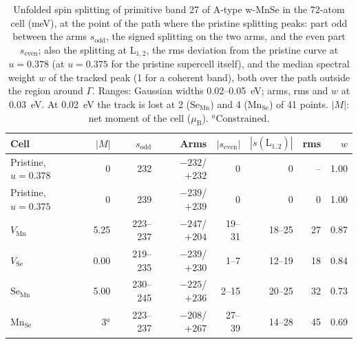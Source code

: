 \begin{table}[t]
\centering
\caption{Unfolded spin splitting of primitive band 27 of A-type w-MnSe in the 72-atom cell (meV), at the
point of the path where the pristine splitting peaks: part odd between the arms $s_{\mathrm{odd}}$,
the signed splitting on the two arms, and the even part $s_{\mathrm{even}}$; also the
splitting at L$_{1,2}$, the rms deviation from the pristine curve at $u = 0.378$ (at $u = 0.375$ for the
pristine supercell itself), and the median spectral weight $w$ of the tracked peak (1 for a coherent
band), both over the path outside the region around $\Gamma$. Ranges: Gaussian widths 0.02--0.05~eV;
arms, rms and $w$ at 0.03~eV. At 0.02~eV the track is lost at 2 ($\mathrm{Se}_{\mathrm{Mn}}$) and 4
($\mathrm{Mn}_{\mathrm{Se}}$) of 41 points. $|M|$: net moment of the cell ($\mu_{\mathrm{B}}$). $^a$Constrained.}
\label{tab:stage5}
\small\setlength{\tabcolsep}{4pt}
\begin{tabular}{lrrrrrrr}
\toprule
Cell & $|M|$ & $s_{\mathrm{odd}}$ & Arms & $|s_{\mathrm{even}}|$ & $|s(\mathrm{L}_{1,2})|$ & rms & $w$ \\
\midrule
Pristine, $u = 0.378$ & 0 & 232 & $-232$/$+232$ & 0 & 0 & -- & 1.00 \\
Pristine, $u = 0.375$ & 0 & 239 & $-239$/$+239$ & 0 & 0 & 0 & 1.00 \\
$V_{\mathrm{Mn}}$ & 5.25 & 223--237 & $-247$/$+204$ & 19--31 & 18--25 & 27 & 0.87 \\
$V_{\mathrm{Se}}$ & 0.00 & 219--235 & $-239$/$+230$ & 1--7 & 12--19 & 18 & 0.84 \\
$\mathrm{Se}_{\mathrm{Mn}}$ & 5.00 & 230--245 & $-225$/$+236$ & 2--15 & 20--25 & 32 & 0.73 \\
$\mathrm{Mn}_{\mathrm{Se}}$ & 3$^a$ & 223--237 & $-208$/$+267$ & 27--39 & 14--28 & 45 & 0.69 \\
\bottomrule
\end{tabular}
\end{table}
